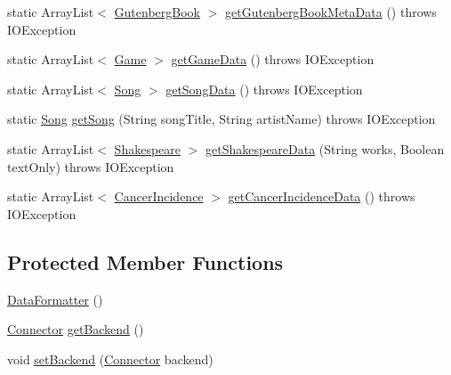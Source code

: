 \begin{DoxyCompactItemize}
\item 
static Array\+List$<$ \hyperlink{classbridges_1_1data__src__dependent_1_1_gutenberg_book}{Gutenberg\+Book} $>$ \hyperlink{classbridges_1_1connect_1_1_data_formatter_a4bd21bd830238db40b511474afc77b61}{get\+Gutenberg\+Book\+Meta\+Data} ()  throws I\+O\+Exception 
\item 
static Array\+List$<$ \hyperlink{classbridges_1_1data__src__dependent_1_1_game}{Game} $>$ \hyperlink{classbridges_1_1connect_1_1_data_formatter_a4098317468be22b4284156d6cd2212e1}{get\+Game\+Data} ()  throws I\+O\+Exception 
\item 
static Array\+List$<$ \hyperlink{classbridges_1_1data__src__dependent_1_1_song}{Song} $>$ \hyperlink{classbridges_1_1connect_1_1_data_formatter_a6a2ded4ccec11234434b83a3e408fb67}{get\+Song\+Data} ()  throws I\+O\+Exception 
\item 
static \hyperlink{classbridges_1_1data__src__dependent_1_1_song}{Song} \hyperlink{classbridges_1_1connect_1_1_data_formatter_ad1d2071025ce9daa42ab69af8eb4749b}{get\+Song} (String song\+Title, String artist\+Name)  throws I\+O\+Exception 
\item 
static Array\+List$<$ \hyperlink{classbridges_1_1data__src__dependent_1_1_shakespeare}{Shakespeare} $>$ \hyperlink{classbridges_1_1connect_1_1_data_formatter_ac090a4d67b38b9649bf811906f9a630a}{get\+Shakespeare\+Data} (String works, Boolean text\+Only)  throws I\+O\+Exception 
\item 
static Array\+List$<$ \hyperlink{classbridges_1_1data__src__dependent_1_1_cancer_incidence}{Cancer\+Incidence} $>$ \hyperlink{classbridges_1_1connect_1_1_data_formatter_af26cb09a93bf326fe14ad8fecf46b4f8}{get\+Cancer\+Incidence\+Data} ()  throws I\+O\+Exception 
\end{DoxyCompactItemize}
\subsection*{Protected Member Functions}
\begin{DoxyCompactItemize}
\item 
\hyperlink{classbridges_1_1connect_1_1_data_formatter_a31efd2251e98942e58e743dff213ef27}{Data\+Formatter} ()
\item 
\hyperlink{classbridges_1_1connect_1_1_connector}{Connector} \hyperlink{classbridges_1_1connect_1_1_data_formatter_a29cf4c2b0c5629d63a76b60569355c65}{get\+Backend} ()
\item 
void \hyperlink{classbridges_1_1connect_1_1_data_formatter_af9b878e5c092234a6ab5f8c11bee1fbd}{set\+Backend} (\hyperlink{classbridges_1_1connect_1_1_connector}{Connector} backend)
\end{DoxyCompactItemize}


